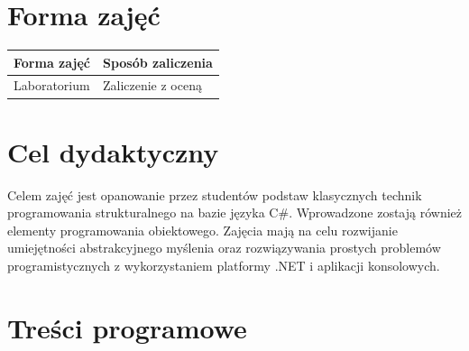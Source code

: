 \documentclass[12pt, a4paper]{article}
\begin{document}
\section{Forma zajęć}

\begin{tabular}{ll}
  \hline
  \textbf{Forma zajęć} & \textbf{Sposób zaliczenia} \\
  \hline
  Laboratorium & Zaliczenie z oceną \\
  \hline
\end{tabular}

\section{Cel dydaktyczny}

Celem zajęć jest opanowanie przez studentów podstaw klasycznych technik programowania strukturalnego na bazie języka C\#. Wprowadzone zostają również elementy programowania obiektowego. Zajęcia mają na celu rozwijanie umiejętności abstrakcyjnego myślenia oraz rozwiązywania prostych problemów programistycznych z wykorzystaniem platformy .NET i aplikacji konsolowych.

\section{Treści programowe}
\end{document}
